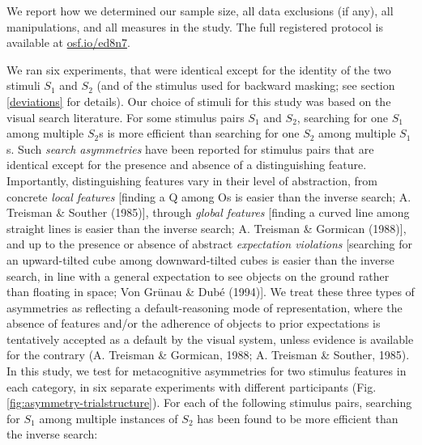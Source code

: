 \documentclass[12pt,twoside]{reedthesis}
\begin{document}
We report how we determined our sample size, all data exclusions (if any), all manipulations, and all measures in the study. The full registered protocol is available at \url{osf.io/ed8n7}.

We ran six experiments, that were identical except for the identity of the two stimuli \(S_1\) and \(S_2\) (and of the stimulus used for backward masking; see section \ref{deviations} for details). Our choice of stimuli for this study was based on the visual search literature. For some stimulus pairs \(S_1\) and \(S_2\), searching for one \(S_1\) among multiple \(S_2\)s is more efficient than searching for one \(S_2\) among multiple \(S_1\)s. Such \emph{search asymmetries} have been reported for stimulus pairs that are identical except for the presence and absence of a distinguishing feature. Importantly, distinguishing features vary in their level of abstraction, from concrete \emph{local features} {[}finding a Q among Os is easier than the inverse search; A. Treisman \& Souther (1985){]}, through \emph{global features} {[}finding a curved line among straight lines is easier than the inverse search; A. Treisman \& Gormican (1988){]}, and up to the presence or absence of abstract \emph{expectation violations} {[}searching for an upward-tilted cube among downward-tilted cubes is easier than the inverse search, in line with a general expectation to see objects on the ground rather than floating in space; Von Grünau \& Dubé (1994){]}. We treat these three types of asymmetries as reflecting a default-reasoning mode of representation, where the absence of features and/or the adherence of objects to prior expectations is tentatively accepted as a default by the visual system, unless evidence is available for the contrary (A. Treisman \& Gormican, 1988; A. Treisman \& Souther, 1985). In this study, we test for metacognitive asymmetries for two stimulus features in each category, in six separate experiments with different participants (Fig. \ref{fig:asymmetry-trialstructure}). For each of the following stimulus pairs, searching for \(S_1\) among multiple instances of \(S_2\) has been found to be more efficient than the inverse search:
\end{document}
